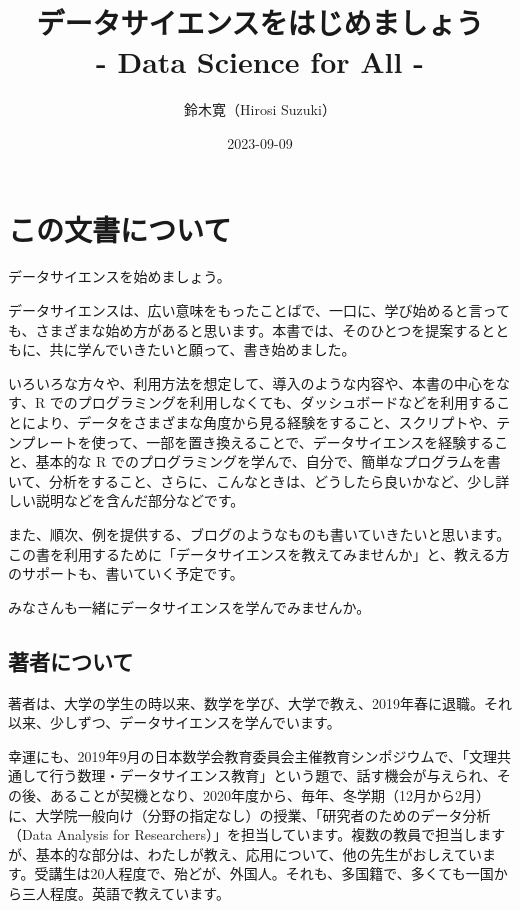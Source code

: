 \documentclass[
  xelatex, ja=standard]{bxjsbook}
\title{データサイエンスをはじめましょう\\
- Data Science for All -}
\author{鈴木寛（Hirosi Suzuki）}
\date{2023-09-09}
\theoremstyle{definition}
\theoremstyle{definition}
\theoremstyle{definition}
\theoremstyle{definition}
\theoremstyle{remark}
\begin{document}
\maketitle

{
\setcounter{tocdepth}{1}
\tableofcontents
}
\hypertarget{ux3053ux306eux6587ux66f8ux306bux3064ux3044ux3066}{%
\chapter*{この文書について}\label{ux3053ux306eux6587ux66f8ux306bux3064ux3044ux3066}}

データサイエンスを始めましょう。

データサイエンスは、広い意味をもったことばで、一口に、学び始めると言っても、さまざまな始め方があると思います。本書では、そのひとつを提案するとともに、共に学んでいきたいと願って、書き始めました。

いろいろな方々や、利用方法を想定して、導入のような内容や、本書の中心をなす、R でのプログラミングを利用しなくても、ダッシュボードなどを利用することにより、データをさまざまな角度から見る経験をすること、スクリプトや、テンプレートを使って、一部を置き換えることで、データサイエンスを経験すること、基本的な R でのプログラミングを学んで、自分で、簡単なプログラムを書いて、分析をすること、さらに、こんなときは、どうしたら良いかなど、少し詳しい説明などを含んだ部分などです。

また、順次、例を提供する、ブログのようなものも書いていきたいと思います。この書を利用するために「データサイエンスを教えてみませんか」と、教える方のサポートも、書いていく予定です。

みなさんも一緒にデータサイエンスを学んでみませんか。

\hypertarget{ux8457ux8005ux306bux3064ux3044ux3066}{%
\section*{著者について}\label{ux8457ux8005ux306bux3064ux3044ux3066}}

著者は、大学の学生の時以来、数学を学び、大学で教え、2019年春に退職。それ以来、少しずつ、データサイエンスを学んでいます。

幸運にも、2019年9月の日本数学会教育委員会主催教育シンポジウムで、「文理共通して行う数理・データサイエンス教育」という題で、話す機会が与えられ、その後、あることが契機となり、2020年度から、毎年、冬学期（12月から2月）に、大学院一般向け（分野の指定なし）の授業、「研究者のためのデータ分析（Data Analysis for Researchers）」を担当しています。複数の教員で担当しますが、基本的な部分は、わたしが教え、応用について、他の先生がおしえています。受講生は20人程度で、殆どが、外国人。それも、多国籍で、多くても一国から三人程度。英語で教えています。
\end{document}
